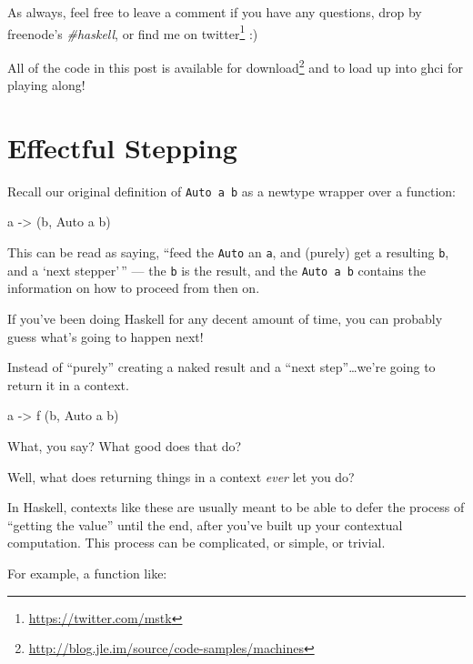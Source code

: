 \documentclass[]{article}
\newenvironment{Shaded}{}{}
\newcommand{\DataTypeTok}[1]{\textcolor[rgb]{0.56,0.13,0.00}{{#1}}}
\newcommand{\OtherTok}[1]{\textcolor[rgb]{0.00,0.44,0.13}{{#1}}}
\newcommand{\NormalTok}[1]{{#1}}
\renewcommand{\href}[2]{#2\footnote{\url{#1}}}
\begin{document}
As always, feel free to leave a comment if you have any questions, drop
by freenode's \emph{\#haskell}, or find me on
\href{https://twitter.com/mstk}{twitter} :)

All of the code in this post is
\href{http://blog.jle.im/source/code-samples/machines}{available for
download} and to load up into ghci for playing along!

\section{Effectful Stepping}\label{effectful-stepping}

Recall our original definition of \texttt{Auto\ a\ b} as a newtype
wrapper over a function:

\begin{Shaded}
\begin{Highlighting}[]
\NormalTok{a }\OtherTok{->} \NormalTok{(b, }\DataTypeTok{Auto} \NormalTok{a b)}
\end{Highlighting}
\end{Shaded}

This can be read as saying, ``feed the \texttt{Auto} an \texttt{a}, and
(purely) get a resulting \texttt{b}, and a `next stepper'\,'' --- the
\texttt{b} is the result, and the \texttt{Auto\ a\ b} contains the
information on how to proceed from then on.

If you've been doing Haskell for any decent amount of time, you can
probably guess what's going to happen next!

Instead of ``purely'' creating a naked result and a ``next
step''\ldots{}we're going to return it in a context.

\begin{Shaded}
\begin{Highlighting}[]
\NormalTok{a }\OtherTok{->} \NormalTok{f (b, }\DataTypeTok{Auto} \NormalTok{a b)}
\end{Highlighting}
\end{Shaded}

What, you say? What good does that do?

Well, what does returning things in a context \emph{ever} let you do?

In Haskell, contexts like these are usually meant to be able to defer
the process of ``getting the value'' until the end, after you've built
up your contextual computation. This process can be complicated, or
simple, or trivial.

For example, a function like:
\end{document}
